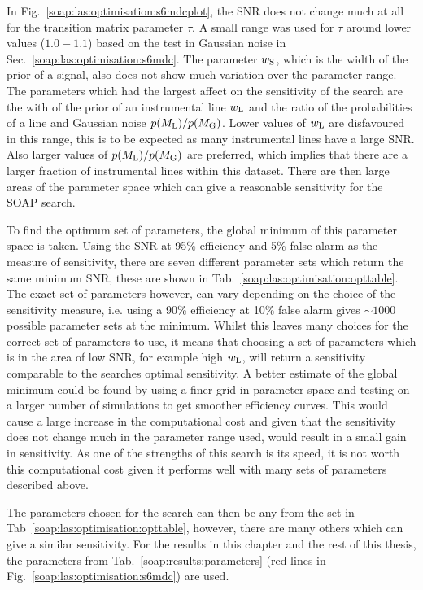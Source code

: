 In Fig.~\ref{soap:las:optimisation:s6mdcplot}, the \gls{SNR} does not change much at all for the transition matrix parameter $\tau$.
A small range was used for $\tau$ around lower values ($1.0 - 1.1$) based on the test in Gaussian noise in Sec.~\ref{soap:las:optimisation:s6mdc}. 
The parameter $w_{\rm{S}}$, which is the width of the prior of a signal, also does not show much variation over the parameter range. 
The parameters which had the largest affect on the sensitivity of the search are the with of the prior of an instrumental line $w_{\rm{L}}$ and the ratio of the probabilities of a line and Gaussian noise $p(M_{\rm{L}})/p(M_{\rm{G}})$.
Lower values of $w_{\rm{L}}$ are disfavoured in this range, this is to be expected as many instrumental lines have a large \gls{SNR}.
Also larger values of $p(M_{\rm{L}})/p(M_{\rm{G}})$ are preferred, which implies that there are a larger fraction of instrumental lines within this dataset.
There are then large areas of the parameter space which can give a reasonable sensitivity for the SOAP search.

To find the optimum set of parameters, the global minimum of this parameter space is taken.
Using the \gls{SNR} at 95\% efficiency and 5\% false alarm as the measure of sensitivity, there are seven different parameter sets which return the same minimum \gls{SNR}, these are shown in Tab.~\ref{soap:las:optimisation:opttable}.
The exact set of parameters however, can vary depending on the choice of the sensitivity measure, i.e. using a 90\% efficiency at 10\% false alarm gives $\sim 1000$ possible parameter sets at the minimum.
Whilst this leaves many choices for the correct set of parameters to use, it means that choosing a set of parameters which is in the area of low \gls{SNR}, for example high $w_{\rm{L}}$, will return a sensitivity comparable to the searches optimal sensitivity.
A better estimate of the global minimum could be found by using a finer grid in parameter space and testing on a larger number of simulations to get smoother efficiency curves.
This would cause a large increase in the computational cost and given that the sensitivity does not change much in the parameter range used, would result in a small gain in sensitivity. As one of the strengths of this search is its speed, it is not worth this computational cost given it performs well with many sets of parameters described above.

The parameters chosen for the search can then be any from the set in Tab~\ref{soap:las:optimisation:opttable}, however, there are many others which can give a similar sensitivity. 
For the results in this chapter and the rest of this thesis, the parameters from Tab.~\ref{soap:results:parameters} (red lines in Fig.~\ref{soap:las:optimisation:s6mdc}) are used. 

